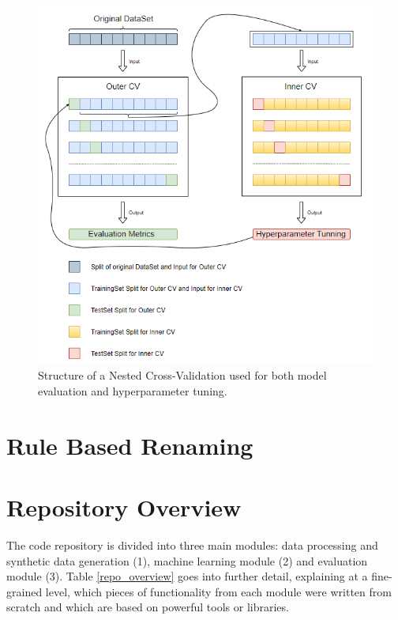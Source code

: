 \begin{figure}[H]
  \centering
  \includegraphics[scale=0.75]{Images/nested_cv.png}
  \caption{Structure of a Nested Cross-Validation used for both model evaluation and hyperparameter tuning.}
  \label{NestedCV}
\end{figure}

\section{Rule Based Renaming}

\section{Repository Overview}

The code repository is divided into three main modules: data processing and synthetic data generation (1), machine learning module (2) and evaluation module (3). Table \ref{repo_overview} goes into further detail, explaining at a fine-grained level, which pieces of functionality from each module were written from scratch and which are based on powerful tools or libraries. \\

